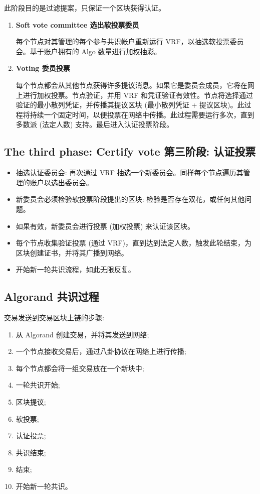 此阶段目的是过滤提案，只保证一个区块获得认证。
\begin{enumerate}
    \item \textbf{Soft vote committee 选出软投票委员}

    每个节点对其管理的每个参与共识帐户重新运行 VRF，以抽选软投票委员会。基于账户拥有的 Algo 数量进行加权抽彩。

    \item \textbf{Voting 委员投票}

    每个节点都会从其他节点获得许多提议消息。如果它是委员会成员，它将在网上进行加权投票。节点验证，并用 VRF 和凭证验证有效性。节点将选择通过验证的最小散列凭证，并传播其提议区块 (最小散列凭证 + 提议区块)。此过程将持续一个固定时间，以便投票在网络中传播。此过程需要运行多次，直到多数派 (法定人数) 支持。最后进入认证投票阶段。
\end{enumerate}

\subsection{The third phase: Certify vote 第三阶段: 认证投票}

\begin{itemize}
    \item 抽选认证委员会:
    再次通过 VRF 抽选一个新委员会。同样每个节点遍历其管理的账户以选出委员会。
    \item 新委员会必须检验软投票阶段提出的区块: 检验是否存在双花，或任何其他问题。
    \item 如果有效，新委员会进行投票 (加权投票) 来认证该区块。
    \item 每个节点收集验证投票 (通过 VRF)，直到达到法定人数，触发此轮结束，为区块创建证书，并将其广播到网络。
    \item 开始新一轮共识流程，如此无限反复。
\end{itemize}

\subsection{Algorand 共识过程}

交易发送到交易区块上链的步骤:
\begin{enumerate}
    \item 从 Algorand 创建交易，并将其发送到网络;
    \item 一个节点接收交易后，通过八卦协议在网络上进行传播;
    \item 每个节点都会将一组交易放在一个新块中;
    \item 一轮共识开始;
    \item 区块提议;
    \item 软投票;
    \item 认证投票;
    \item 共识结束;
    \item 结束;
    \item 开始新一轮共识。
\end{enumerate}

